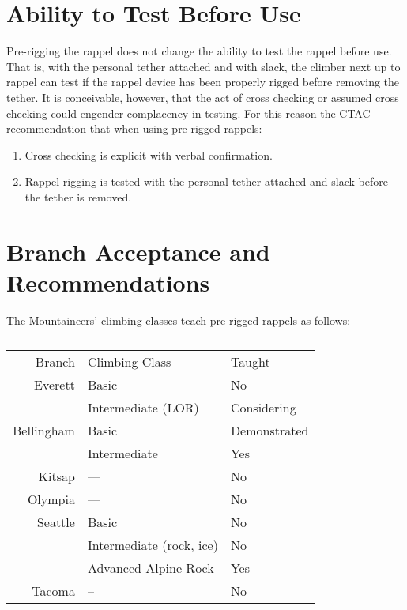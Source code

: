 \documentclass[nonacm,acmtog,authordraft]{acmart}
\begin{document}
\section{Ability to Test Before Use}

  Pre-rigging the rappel does not change the ability to test the rappel before
  use.  That is, with the personal tether attached and with slack, the climber
  next up to rappel can test if the rappel device has been properly rigged
  before removing the tether.  It is conceivable, however, that the act of
  cross checking or assumed cross checking could engender complacency in
  testing.  For this reason the CTAC recommendation that when using pre-rigged
  rappels:

  \begin{enumerate}
  \item Cross checking is explicit with verbal confirmation.
  \item Rappel rigging is tested with the personal tether attached and slack
    before the tether is removed.
  \end{enumerate}

\section{Branch Acceptance and Recommendations}

  The Mountaineers' climbing classes teach pre-rigged rappels as follows:

  \begin{table}
  \begin{tabular}{rll}
    Branch     & Climbing Class & Taught \\
    Everett    & Basic & No \\
               & Intermediate (LOR) & Considering \\
    Bellingham & Basic & Demonstrated \\
               & Intermediate & Yes \\
    Kitsap & --- & No \\
    Olympia & --- & No \\
    Seattle & Basic & No \\
            & Intermediate (rock, ice) & No \\
            & Advanced Alpine Rock     & Yes \\
    Tacoma  & --  & No
  \end{tabular}
  \caption{}
  \end{table}
\end{document}
